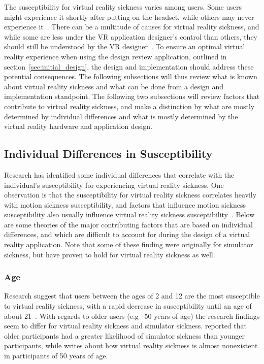 
The susceptibility for virtual reality sickness varies among users. Some users might experience it shortly after putting on the headset, 
while others may never experience it~\citep{Stanney2003}.
There can be a multitude of causes for virtual reality sickness, and while some are less under the VR application designer's control than others, 
they should still be understood by the VR designer~\citep{Stanney2003}. 
To ensure an optimal virtual reality experience when using the design review application, outlined in section~\vref{sec:initial_design}, 
the design and implementation should address these potential consequences. 
The following subsections will thus review what is known about virtual reality sickness and what can be done from a design and implementation standpoint.
The following two subsections will review factors that contribute to virtual reality sickness, and make a distinction by
what are mostly determined by individual differences and what is mostly determined by the virtual reality hardware and application design. 

\subsection{Individual Differences in Susceptibility}
Research has identified some individual differences that correlate with the individual's susceptibility for experiencing virtual reality sickness. 
One observation is that the susceptibility for virtual reality sickness correlates heavily with motion sickness susceptibility, and 
factors that influence motion sickness susceptibility also usually influence virtual reality sickness susceptibility~\citep{Stanney2003}.
Below are some theories of the major contributing factors that are based on individual differences, 
and which are difficult to account for during the design of a virtual reality application. 
Note that some of these finding were originally for simulator sickness, but have proven to hold for virtual reality sickness as well.

\subsubsection{Age}
Research suggest that users between the ages of 2 and 12 are the most susceptible to virtual reality sickness, with a rapid decrease in susceptibility 
until an age of about 21~\citep{Kolasinski1995}. With regards to older users (e.g~ 50 years of age) the research findings seem to differ for virtual reality sickness
and simulator sickness. \citet{Brooks2010} reported that older participants had a greater likelihood of simulator sickness than younger participants, while
\citet{Jr2000} writes about how virtual reality sickness is almost nonexistent in participants of 50 years of age. 

